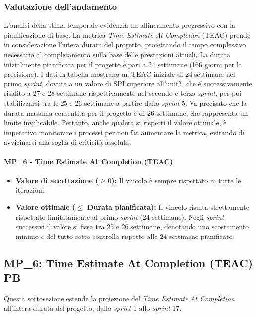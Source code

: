 \documentclass[12pt, a4paper]{article}
\begin{document}
\subsubsection*{Valutazione dell'andamento}
L'analisi della stima temporale evidenzia un allineamento progressivo con la pianificazione di base. La metrica \textit{Time Estimate At Completion} (TEAC) prende in considerazione l'intera durata del progetto, proiettando il tempo complessivo necessario al completamento sulla base delle prestazioni attuali. La durata inizialmente pianificata per il progetto è pari a 24 settimane (166 giorni per la precisione). I dati in tabella mostrano un TEAC iniziale di 24 settimane nel primo \textit{sprint}, dovuto a un valore di SPI superiore all'unità, che è successivamente risalito a 27 e 28 settimane rispettivamente nel secondo e terzo \textit{sprint}, per poi stabilizzarsi tra le 25 e 26 settimane a partire dallo \textit{sprint} 5.
Va precisato che la durata massima consentita per il progetto è di 26 settimane, che rappresenta un limite invalicabile. Pertanto, anche qualora si rispetti il valore ottimale, è imperativo monitorare i processi per non far aumentare la metrica, evitando di avvicinarsi alla soglia di criticità assoluta.

\paragraph*{MP\_6 - Time Estimate At Completion (TEAC)}
\begin{itemize}
    \item \textbf{Valore di accettazione ($\ge 0$):} Il vincolo è sempre rispettato in tutte le iterazioni.
    \item \textbf{Valore ottimale ($\le$ Durata pianificata):} Il vincolo risulta strettamente rispettato limitatamente al primo \textit{sprint} (24 settimane). Negli \textit{sprint} successivi il valore si fissa tra 25 e 26 settimane, denotando uno scostamento minimo e del tutto sotto controllo rispetto alle 24 settimane pianificate.
\end{itemize}

\subsection{MP\_6: Time Estimate At Completion (TEAC) PB}
Questa sottosezione estende la proiezione del \textit{Time Estimate At Completion} all'intera durata del progetto, dallo \textit{sprint} 1 allo \textit{sprint} 17.
\end{document}
